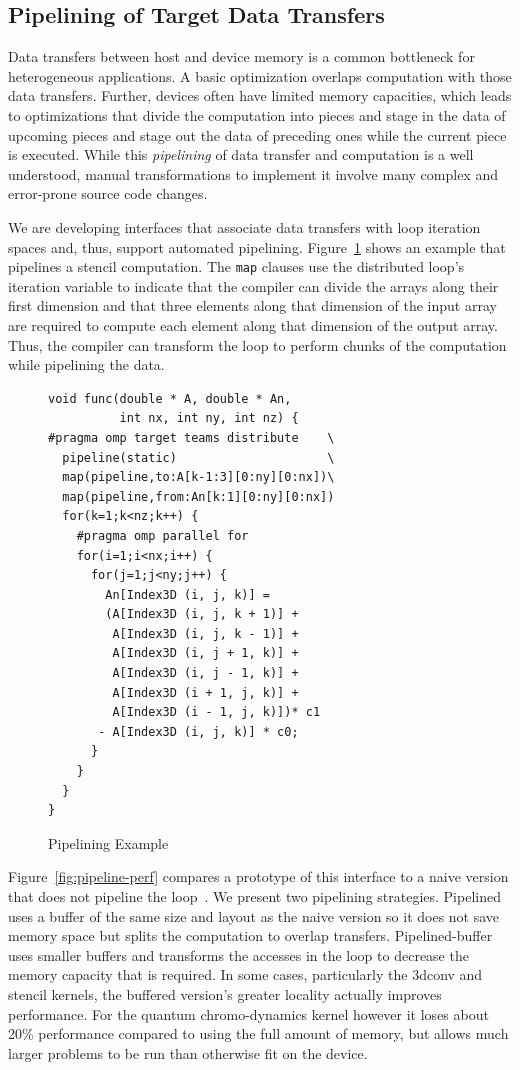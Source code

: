 \subsection{Pipelining of Target Data Transfers}
\label{sub:pipelining}

Data transfers between host and device memory is a common bottleneck 
for heterogeneous applications. A basic optimization overlaps computation
with those data transfers. Further, devices often have limited memory 
capacities, which leads to optimizations that divide the computation
into pieces and stage in the data of upcoming pieces and stage out the
data of preceding ones while the current piece is executed. While this
\emph{pipelining} of data transfer and computation is a well understood,
manual transformations to implement it involve many complex
and error-prone source code changes. 

We are developing interfaces that associate data transfers with loop iteration 
spaces and, thus, support automated pipelining. Figure~\ref{fig:pipeline} shows
an example that pipelines a stencil computation. The \texttt{map} clauses use 
the distributed loop's iteration variable to indicate that the compiler 
can divide the arrays along their first dimension and that three elements 
along that dimension of the input array are required to compute each element 
along that dimension of the output array. Thus, the compiler can transform 
the loop to perform chunks of the computation while pipelining the data.

\begin{figure}
\begin{verbatim}
void func(double * A, double * An,
          int nx, int ny, int nz) {
#pragma omp target teams distribute    \
  pipeline(static)                     \
  map(pipeline,to:A[k-1:3][0:ny][0:nx])\
  map(pipeline,from:An[k:1][0:ny][0:nx])
  for(k=1;k<nz;k++) {
    #pragma omp parallel for
    for(i=1;i<nx;i++) {
      for(j=1;j<ny;j++) {
        An[Index3D (i, j, k)] =
        (A[Index3D (i, j, k + 1)] +
         A[Index3D (i, j, k - 1)] +
         A[Index3D (i, j + 1, k)] +
         A[Index3D (i, j - 1, k)] +
         A[Index3D (i + 1, j, k)] +
         A[Index3D (i - 1, j, k)])* c1
       - A[Index3D (i, j, k)] * c0;
      }
    } 
  }
}
\end{verbatim}
\caption{Pipelining Example\label{fig:pipeline}}
\end{figure}

Figure~\ref{fig:pipeline-perf} compares a prototype of this interface to a 
naive version that does not pipeline the loop~\cite{cui2017directive}. We 
present two pipelining strategies. Pipelined uses a buffer of the same size 
and layout as the naive version so it does not save memory space but splits 
the computation to overlap transfers. Pipelined-buffer uses smaller buffers
and transforms the accesses in the loop to decrease the memory capacity that
is required. In some cases, particularly the 3dconv and stencil kernels, the 
buffered version's greater locality actually improves performance. For the 
quantum chromo-dynamics kernel however it loses about 20\% performance 
compared to using the full amount of memory, but allows much larger 
problems to be run than otherwise fit on the device.

